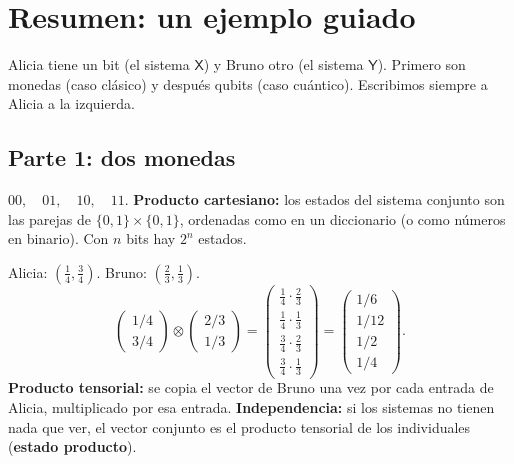\documentclass[11pt, a4paper, twoside, openright]{report}
\begin{document}
\providecommand{\pasoguiado}[3]{%
\begin{tcolorbox}[colback=gray!6!white,colframe=gray!55!black,fonttitle=\bfseries,title={#1}]
#2
\tcblower
\small #3
\end{tcolorbox}}

\cleardoublepage
\section{Resumen: un ejemplo guiado}

\noindent Alicia tiene un bit (el sistema $\mathsf{X}$) y Bruno otro (el sistema $\mathsf{Y}$). Primero son monedas (caso clásico) y después qubits (caso cuántico). Escribimos siempre a Alicia a la izquierda.

\subsection{Parte 1: dos monedas}

\pasoguiado{Paso 1. ¿Qué resultados puede haber?}
{$00,\quad 01,\quad 10,\quad 11$.}
{\textbf{Producto cartesiano:} los estados del sistema conjunto son las parejas de $\{0,1\}\times\{0,1\}$, ordenadas como en un diccionario (o como números en binario). Con $n$ bits hay $2^n$ estados.}

\pasoguiado{Paso 2. Cada uno lanza su moneda, por separado}
{Alicia: $\left(\frac14,\frac34\right)$. \quad Bruno: $\left(\frac23,\frac13\right)$.
\[ \begin{pmatrix}1/4\\3/4\end{pmatrix}\otimes\begin{pmatrix}2/3\\1/3\end{pmatrix} = \begin{pmatrix}\frac14\cdot\frac23\\[0.5mm]\frac14\cdot\frac13\\[0.5mm]\frac34\cdot\frac23\\[0.5mm]\frac34\cdot\frac13\end{pmatrix} = \begin{pmatrix}1/6\\1/12\\1/2\\1/4\end{pmatrix}. \]}
{\textbf{Producto tensorial:} se copia el vector de Bruno una vez por cada entrada de Alicia, multiplicado por esa entrada. \textbf{Independencia:} si los sistemas no tienen nada que ver, el vector conjunto es el producto tensorial de los individuales (\textbf{estado producto}).}
\end{document}
